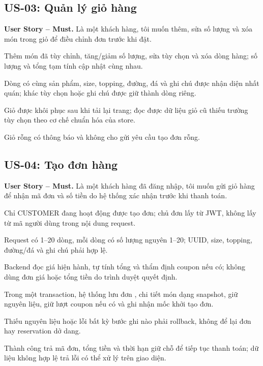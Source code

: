 \subsection{US-03: Quản lý giỏ hàng}
\label{us:03}
\noindent\textbf{User Story -- Must.}
Là một khách hàng, tôi muốn thêm, sửa số lượng và xóa món trong giỏ để
điều chỉnh đơn trước khi đặt.
\begin{acceptance}
    \item Thêm món đã tùy chỉnh, tăng/giảm số lượng, sửa tùy chọn và xóa
    dòng hàng; số lượng và tổng tạm tính cập nhật cùng nhau.
    \item Dòng có cùng sản phẩm, size, topping, đường, đá và ghi chú được
    nhận diện nhất quán; khác tùy chọn hoặc ghi chú được giữ thành dòng riêng.
    \item Giỏ được khôi phục sau khi tải lại trang; đọc được dữ liệu giỏ
    cũ thiếu trường tùy chọn theo cơ chế chuẩn hóa của store.
    \item Giỏ rỗng có thông báo và không cho gửi yêu cầu tạo đơn rỗng.
\end{acceptance}

\subsection{US-04: Tạo đơn hàng}
\label{us:04}
\noindent\textbf{User Story -- Must.}
Là một khách hàng đã đăng nhập, tôi muốn gửi giỏ hàng để nhận mã đơn và
số tiền do hệ thống xác nhận trước khi thanh toán.
\begin{acceptance}
    \item Chỉ CUSTOMER đang hoạt động được tạo đơn; chủ đơn lấy từ JWT,
    không lấy từ mã người dùng trong nội dung request.
    \item Request có 1--20 dòng, mỗi dòng có số lượng nguyên 1--20;
    UUID, size, topping, đường/đá và ghi chú phải hợp lệ.
    \item Backend đọc giá hiện hành, tự tính tổng và thẩm định coupon
    nếu có; không dùng đơn giá hoặc tổng tiền do trình duyệt quyết định.
    \item Trong một transaction, hệ thống lưu đơn , chi
    tiết món dạng snapshot, giữ nguyên liệu, giữ lượt coupon nếu có và
    ghi nhận mốc khởi tạo đơn.
    \item Thiếu nguyên liệu hoặc lỗi bất kỳ bước ghi nào phải rollback,
    không để lại đơn hay reservation dở dang.
    \item Thành công trả mã đơn, tổng tiền và thời hạn giữ chỗ để tiếp
    tục thanh toán; dữ liệu không hợp lệ trả lỗi có thể xử lý trên giao diện.
\end{acceptance}

